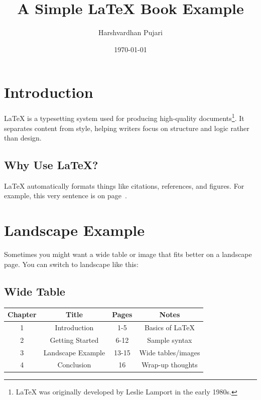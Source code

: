\documentclass{book}
\title{A Simple LaTeX Book Example}
\author{Harshvardhan Pujari}
\date{\today}
\begin{document}
	
	\maketitle  
	
	\tableofcontents  
	\newpage
	
	\chapter{Introduction}

	
	LaTeX is a typesetting system used for producing high-quality documents\footnote{LaTeX was originally developed by Leslie Lamport in the early 1980s.}. It separates content from style, helping writers focus on structure and logic rather than design.
	
	\section{Why Use LaTeX?}
	
	LaTeX automatically formats things like citations, references, and figures. For example, this very sentence is on page~\thepage.
	
	\newpage  
	
	\chapter{Landscape Example}
	
	Sometimes you might want a wide table or image that fits better on a landscape page. You can switch to landscape like this:
	
	\begin{landscape}
		\section{Wide Table}
		
		\begin{tabular}{|c|c|c|c|}
			\hline
			Chapter & Title & Pages & Notes \\
			\hline
			1 & Introduction & 1-5 & Basics of LaTeX \\
			2 & Getting Started & 6-12 & Sample syntax \\
			3 & Landscape Example & 13-15 & Wide tables/images \\
			4 & Conclusion & 16 & Wrap-up thoughts \\
			\hline
		\end{tabular}
	\end{landscape}
	
\end{document}
